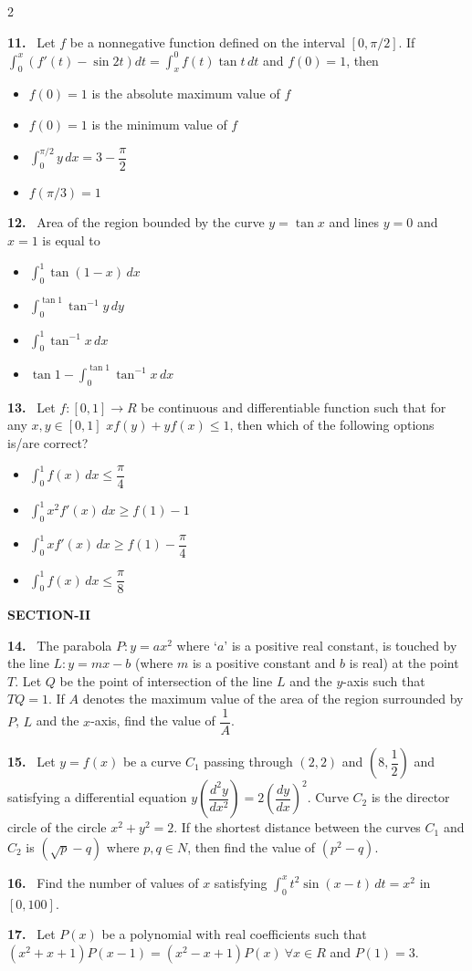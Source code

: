 \documentclass[10pt]{extarticle}
\newcommand{\sect}[1]{\par\smallskip\noindent\textbf{#1}\par}
\newcommand{\qn}[1]{\par\smallskip\noindent\textbf{#1.}~}
\newenvironment{qoptions}{\begin{itemize}[leftmargin=1.8em,itemsep=1pt,topsep=2pt,label={}]}{\end{itemize}}
\newcommand{\opt}[2]{\item[(#1)] #2}
\begin{document}
\begin{multicols}{2}
\begin{qoptions}
\end{qoptions}
\qn{11} Let $f$ be a nonnegative function defined on the interval $[0,\pi/2]$. If $\displaystyle\int_0^x\left(f'(t)-\sin2t\right)dt=\int_x^0f(t)\tan t\,dt$ and $f(0)=1$, then
\begin{qoptions}
\opt{A}{$f(0)=1$ is the absolute maximum value of $f$}
\opt{B}{$f(0)=1$ is the minimum value of $f$}
\opt{C}{$\displaystyle\int_0^{\pi/2}y\,dx=3-\dfrac\pi2$}
\opt{D}{$f(\pi/3)=1$}
\end{qoptions}
\qn{12} Area of the region bounded by the curve $y=\tan x$ and lines $y=0$ and $x=1$ is equal to
\begin{qoptions}
\opt{A}{$\displaystyle\int_0^1\tan(1-x)\,dx$}
\opt{B}{$\displaystyle\int_0^{\tan1}\tan^{-1}y\,dy$}
\opt{C}{$\displaystyle\int_0^1\tan^{-1}x\,dx$}
\opt{D}{$\tan1-\displaystyle\int_0^{\tan1}\tan^{-1}x\,dx$}
\end{qoptions}
\qn{13} Let $f:[0,1]\to R$ be continuous and differentiable function such that for any $x,y\in[0,1]$ $xf(y)+yf(x)\le1$, then which of the following options is/are correct?
\begin{qoptions}
\opt{A}{$\displaystyle\int_0^1f(x)\,dx\le\dfrac\pi4$}
\opt{B}{$\displaystyle\int_0^1x^2f'(x)\,dx\ge f(1)-1$}
\opt{C}{$\displaystyle\int_0^1xf'(x)\,dx\ge f(1)-\dfrac\pi4$}
\opt{D}{$\displaystyle\int_0^1f(x)\,dx\le\dfrac\pi8$}
\end{qoptions}
\sect{SECTION-II}
\qn{14} The parabola $P:y=ax^2$ where `$a$' is a positive real constant, is touched by the line $L:y=mx-b$ (where $m$ is a positive constant and $b$ is real) at the point $T$. Let $Q$ be the point of intersection of the line $L$ and the $y$-axis such that $TQ=1$. If $A$ denotes the maximum value of the area of the region surrounded by $P$, $L$ and the $x$-axis, find the value of $\dfrac1A$.
\qn{15} Let $y=f(x)$ be a curve $C_1$ passing through $(2,2)$ and $\left(8,\dfrac12\right)$ and satisfying a differential equation $y\left(\dfrac{d^2y}{dx^2}\right)=2\left(\dfrac{dy}{dx}\right)^2$. Curve $C_2$ is the director circle of the circle $x^2+y^2=2$. If the shortest distance between the curves $C_1$ and $C_2$ is $\left(\sqrt p-q\right)$ where $p,q\in N$, then find the value of $\left(p^2-q\right)$.
\qn{16} Find the number of values of $x$ satisfying $\displaystyle\int_0^xt^2\sin(x-t)\,dt=x^2$ in $[0,100]$.
\qn{17} Let $P(x)$ be a polynomial with real coefficients such that $\left(x^2+x+1\right)P(x-1)=\left(x^2-x+1\right)P(x)\ \forall x\in R$ and $P(1)=3$.


\end{multicols}
\end{document}
